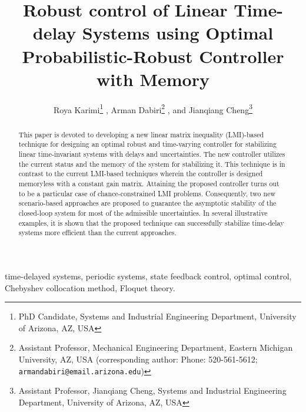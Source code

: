 \documentclass[journal]{IEEEtran}
\title{\LARGE \bf
	Robust control of Linear Time-delay Systems using Optimal Probabilistic-Robust Controller with Memory}
\author{
 Roya Karimi\thanks{PhD Candidate, Systems and Industrial Engineering Department, University of Arizona, AZ, USA}
 ,
 Arman Dabiri\thanks{Assistant Professor, Mechanical Engineering Department, Eastern Michigan University, AZ, USA (corresponding author: Phone: 520-561-5612; {\tt\small armandabiri@email.arizona.edu})}
, and
 Jianqiang Cheng\thanks{Assistant Professor, Jianqiang Cheng, Systems and Industrial Engineering Department, University of Arizona, AZ, USA}
}%
\begin{document}
\maketitle
\thispagestyle{empty}
\pagestyle{empty}


\begin{abstract}
	This paper is devoted to developing a new linear matrix inequality (LMI)-based technique for designing an optimal robust and time-varying controller for stabilizing linear time-invariant systems with delays and uncertainties. The new controller utilizes the current status and the memory of the system for stabilizing it. This technique is in contrast to the current LMI-based techniques wherein the controller is designed memoryless with a constant gain matrix. Attaining the proposed controller turns out to be a particular case of chance-constrained LMI problems. Consequently, two new scenario-based approaches are proposed to guarantee the asymptotic stability of the closed-loop system for most of the admissible uncertainties. In several illustrative examples, it is shown that the proposed technique can successfully stabilize time-delay systems more efficient than the current approaches.
\end{abstract}

\begin{IEEEkeywords}
	time-delayed systems, periodic systems, state feedback control, optimal control, Chebyshev collocation method, Floquet theory.
\end{IEEEkeywords}
\IEEEpeerreviewmaketitle
\end{document}

